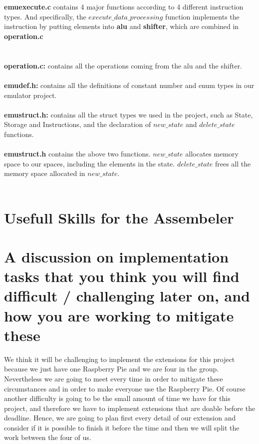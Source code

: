 \documentclass[a4paper]{article}
\begin{document}
\\\\
\textbf{emuexecute.c} contains 4 major functions according to 4 different instruction types. And specifically, the $execute\_data\_processing$ function implements the instruction by putting elements into \textbf{alu} and \textbf{shifter}, which are combined in \textbf{operation.c}\\
\\\\
\textbf{operation.c:} contains all the operations coming from the alu and the shifter.
\\\\
\textbf{emudef.h:} contains all the definitions of constant number and enum types in our emulator project.
\\\\
\textbf{emustruct.h:} contains all the struct types we used in the project, such as State, Storage and Instructions, and the declaration of $new\_state$ and $delete\_state$ functions.
\\\\
\textbf{emustruct.h} contains the above two functions. $new\_state$ allocates memory space to our spaces, including the elements in the state. $delete\_state$ frees all the memory space allocated in $new\_state$.
\\\\


\section{Usefull Skills for the Assembeler}

\section{A discussion on implementation tasks that you think you will find difficult / challenging later on,
and how you are working to mitigate these}
We think it will be challenging to implement the extensions for this project because we just have one Raspberry Pie and we are four in the group. Nevertheless we are going to meet every time in order to mitigate these circumstances and in order to make everyone use the Raspberry Pie.
Of course another difficulty is going to be the small amount of time we have for this project, and therefore we have to implement extensions that are doable before the deadline. Hence, we are going to plan first every detail of our extension and consider if it is possible to finish it before the time and then we will split the work between the four of us.
\end{document}

